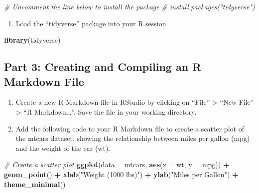 \documentclass[
]{book}
\newenvironment{Shaded}{\begin{snugshade}}{\end{snugshade}}
\newcommand{\AttributeTok}[1]{\textcolor[rgb]{0.13,0.29,0.53}{#1}}
\newcommand{\CommentTok}[1]{\textcolor[rgb]{0.56,0.35,0.01}{\textit{#1}}}
\newcommand{\FunctionTok}[1]{\textcolor[rgb]{0.13,0.29,0.53}{\textbf{#1}}}
\newcommand{\NormalTok}[1]{#1}
\newcommand{\SpecialCharTok}[1]{\textcolor[rgb]{0.81,0.36,0.00}{\textbf{#1}}}
\newcommand{\StringTok}[1]{\textcolor[rgb]{0.31,0.60,0.02}{#1}}
\providecommand{\tightlist}{%
  \setlength{\itemsep}{0pt}\setlength{\parskip}{0pt}}
\begin{document}
\begin{Shaded}
\begin{Highlighting}[]
\CommentTok{\# Uncomment the line below to install the package}
\CommentTok{\# install.packages("tidyverse")}
\end{Highlighting}
\end{Shaded}

\begin{enumerate}
\def\labelenumi{\arabic{enumi}.}
\setcounter{enumi}{1}
\tightlist
\item
  Load the ``tidyverse'' package into your R session.
\end{enumerate}

\begin{Shaded}
\begin{Highlighting}[]
\FunctionTok{library}\NormalTok{(tidyverse)}
\end{Highlighting}
\end{Shaded}

\hypertarget{part-3-creating-and-compiling-an-r-markdown-file}{%
\subsection{Part 3: Creating and Compiling an R Markdown File}\label{part-3-creating-and-compiling-an-r-markdown-file}}

\begin{enumerate}
\def\labelenumi{\arabic{enumi}.}
\item
  Create a new R Markdown file in RStudio by clicking on ``File'' \textgreater{} ``New File'' \textgreater{} ``R Markdown\ldots{}''. Save the file in your working directory.
\item
  Add the following code to your R Markdown file to create a scatter plot of the mtcars dataset, showing the relationship between miles per gallon (mpg) and the weight of the car (wt).
\end{enumerate}

\begin{Shaded}
\begin{Highlighting}[]
\CommentTok{\# Create a scatter plot}
\FunctionTok{ggplot}\NormalTok{(}\AttributeTok{data =}\NormalTok{ mtcars, }\FunctionTok{aes}\NormalTok{(}\AttributeTok{x =}\NormalTok{ wt, }\AttributeTok{y =}\NormalTok{ mpg)) }\SpecialCharTok{+}
  \FunctionTok{geom\_point}\NormalTok{() }\SpecialCharTok{+}
  \FunctionTok{xlab}\NormalTok{(}\StringTok{"Weight (1000 lbs)"}\NormalTok{) }\SpecialCharTok{+}
  \FunctionTok{ylab}\NormalTok{(}\StringTok{"Miles per Gallon"}\NormalTok{) }\SpecialCharTok{+}
  \FunctionTok{theme\_minimal}\NormalTok{()}
\end{Highlighting}
\end{Shaded}
\end{document}
